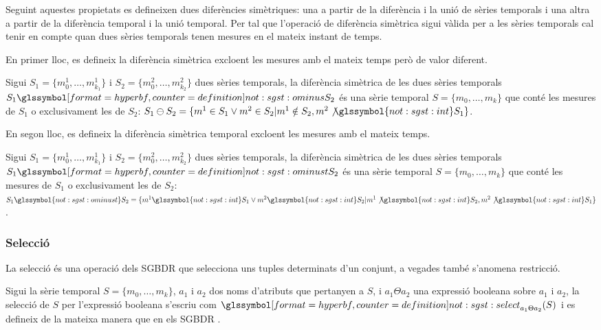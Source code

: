 Seguint aquestes propietats es defineixen dues diferències
simètriques: una a partir de la diferència i la unió de sèries
temporals i una altra a partir de la diferència temporal i la unió
temporal.  Per tal que l'operació de diferència simètrica sigui vàlida
per a les sèries temporals cal tenir en compte quan dues sèries
temporals tenen mesures en el mateix instant de temps.

En primer lloc, es defineix la diferència simètrica excloent les
mesures amb el mateix temps però de valor diferent.
\begin{definition}
  Sigui $S_1=\{m_0^1, \dotsc, m_{k_1}^1\}$ i $S_2=\{m_0^2, \dotsc,
  m_{k_2}^2\}$ dues sèries temporals, la diferència simètrica de les
  dues sèries temporals $S_1 \glssymboldef{not:sgst:ominus} S_2$ és
  una sèrie temporal $S=\{m_0, \dotsc, m_k\}$ que conté les mesures de
  $S_1$ o exclusivament les de $S_2$: $S_1 \ominus S_2 = \{ m^1 \in
  S_1 \vee m^2 \in S_2 | m^1 \notin S_2, m^2
  \not\glssymbol{not:sgst:int} S_1 \}$.
\end{definition}

En segon lloc, es defineix la diferència simètrica temporal excloent les
mesures amb el mateix temps.
\begin{definition}
  Sigui $S_1=\{m_0^1, \dotsc, m_{k_1}^1\}$ i $S_2=\{m_0^2, \dotsc,
  m_{k_2}^2\}$ dues sèries temporals, la diferència simètrica de les
  dues sèries temporals $S_1 \glssymboldef{not:sgst:ominust} S_2$ és
  una sèrie temporal $S=\{m_0, \dotsc, m_k\}$ que conté les mesures de
  $S_1$ o exclusivament les de $S_2$: $S_1
  \glssymbol{not:sgst:ominust} S_2 = \{ m^1 \glssymbol{not:sgst:int}
  S_1 \vee m^2 \glssymbol{not:sgst:int} S_2 | m^1
  \not\glssymbol{not:sgst:int} S_2, m^2 \not\glssymbol{not:sgst:int}
  S_1 \}$.
\end{definition}



\subsubsection{Selecció}

La selecció és una operació dels \gls{SGBDR} que selecciona uns tuples
determinats d'un conjunt, a vegades també s'anomena restricció.

\begin{definition}[Selecció]
  Sigui la sèrie temporal $S=\{ m_0,\dotsc,m_k\}$, $a_1$ i $a_2$ dos
  noms d'atributs que pertanyen a $S$, i $a_1 \Theta a_2$ una
  expressió booleana sobre $a_1$ i $a_2$, la selecció de $S$ per
  l'expressió booleana s'escriu com
  $\glssymboldef{not:sgst:select}_{a_1 \Theta a_2}(S)$  i es defineix
  de la mateixa manera que en els
  \gls{SGBDR} \parencite[cap.~7]{date04:introduction8}.
\end{definition}

